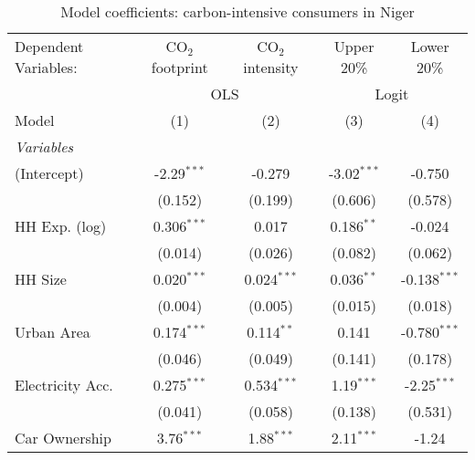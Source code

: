 
\begin{table}[htbp!]
   \centering
   \small
   \begin{adjustbox}{width = 1\textwidth, max height = 0.95\textheight, center}
      \begin{threeparttable}[b]
         \caption{\label{tab:Logit_1_NER} Model coefficients: carbon-intensive consumers in Niger}
         \begin{tabular}{lcccc}
            \tabularnewline \midrule \midrule
            Dependent Variables: & CO$_{2}$ footprint & CO$_{2}$ intensity & Upper 20\%    & Lower 20\%\\   
             & \multicolumn{2}{c}{OLS} & \multicolumn{2}{c}{Logit} \\ 
            Model                & (1)                & (2)                & (3)           & (4)\\  
            \midrule
            \emph{Variables}\\
            (Intercept)          & -2.29$^{***}$      & -0.279             & -3.02$^{***}$ & -0.750\\   
                                 & (0.152)            & (0.199)            & (0.606)       & (0.578)\\   
            HH Exp. (log)        & 0.306$^{***}$      & 0.017              & 0.186$^{**}$  & -0.024\\   
                                 & (0.014)            & (0.026)            & (0.082)       & (0.062)\\   
            HH Size              & 0.020$^{***}$      & 0.024$^{***}$      & 0.036$^{**}$  & -0.138$^{***}$\\   
                                 & (0.004)            & (0.005)            & (0.015)       & (0.018)\\   
            Urban Area           & 0.174$^{***}$      & 0.114$^{**}$       & 0.141         & -0.780$^{***}$\\   
                                 & (0.046)            & (0.049)            & (0.141)       & (0.178)\\   
            Electricity Acc.     & 0.275$^{***}$      & 0.534$^{***}$      & 1.19$^{***}$  & -2.25$^{***}$\\   
                                 & (0.041)            & (0.058)            & (0.138)       & (0.531)\\   
            Car Ownership        & 3.76$^{***}$       & 1.88$^{***}$       & 2.11$^{***}$  & -1.24\\   

\end{tabular}
\end{threeparttable}
\end{adjustbox}
\end{table}
